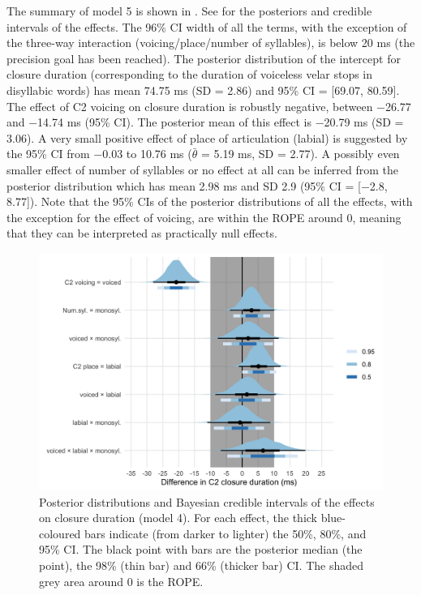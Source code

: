 \documentclass[12pt,a4paper,]{article}
\begin{document}
The summary of model 5 is shown in . See
 for the posteriors and credible intervals of the
effects. The 96\% CI width of all the terms, with the exception of the
three-way interaction (voicing/place/number of syllables), is below 20
ms (the precision goal has been reached). The posterior distribution of
the intercept for closure duration (corresponding to the duration of
voiceless velar stops in disyllabic words) has mean 74.75 ms (SD = 2.86)
and 95\% CI = {[}69.07, 80.59{]}. The effect of C2 voicing on closure
duration is robustly negative, between −26.77 and −14.74 ms (95\% CI).
The posterior mean of this effect is −20.79 ms (SD = 3.06). A very small
positive effect of place of articulation (labial) is suggested by the
95\% CI from −0.03 to 10.76 ms (\(\bar{\theta}\) = 5.19 ms, SD = 2.77).
A possibly even smaller effect of number of syllables or no effect at
all can be inferred from the posterior distribution which has mean 2.98
ms and SD 2.9 (95\% CI = {[}−2.8, 8.77{]}). Note that the 95\% CIs of
the posterior distributions of all the effects, with the exception for
the effect of voicing, are within the ROPE around 0, meaning that they
can be interpreted as practically null effects.

\begin{figure}
\includegraphics[width=\linewidth]{2019-english-rr_files/figure-latex/Figure3-1} \caption{Posterior distributions and Bayesian credible intervals of the effects on closure duration (model 4). For each effect, the thick blue-coloured bars indicate (from darker to lighter) the 50\%, 80\%, and 95\% CI. The black point with bars are the posterior median (the point), the 98\% (thin bar) and 66\% (thicker bar) CI. The shaded grey area around 0 is the ROPE.}\label{f:Figure3}
\end{figure}
\end{document}
